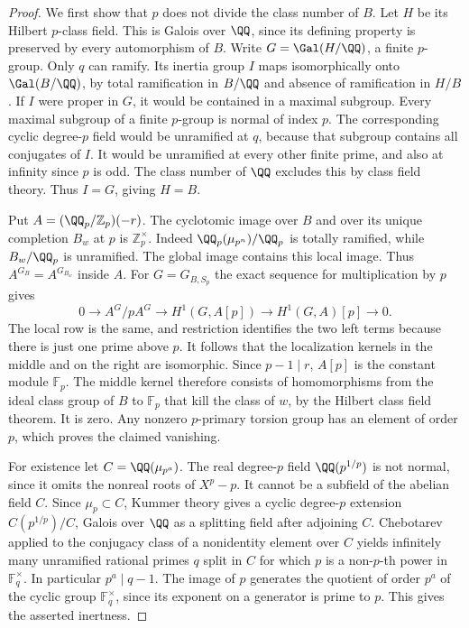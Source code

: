 \documentclass[a4paper,11pt]{article}
\theoremstyle{definition}
\theoremstyle{remark}
\newcommand{\ZZ}{\mathbb Z}\newcommand{\ord}{\operatorname{ord}}
\numberwithin{equation}{section}
\begin{document}
\begin{proof}
We first show that \(p\) does not divide the class number of \(B\).
Let \(H\) be its Hilbert \(p\)-class field. This is Galois over
\(\QQ\), since its defining property is preserved by every
automorphism of \(B\). Write \(G=\Gal(H/\QQ)\), a finite
\(p\)-group. Only \(q\) can ramify. Its inertia group \(I\)
maps isomorphically onto \(\Gal(B/\QQ)\), by total ramification
in \(B/\QQ\) and absence of ramification in \(H/B\).
If \(I\) were proper in \(G\), it would be contained in a
maximal subgroup. Every maximal subgroup of a finite \(p\)-group
is normal of index \(p\). The corresponding cyclic degree-\(p\)
field would be unramified at \(q\), because that subgroup contains
all conjugates of \(I\). It would be unramified at every other
finite prime, and also at infinity since \(p\) is odd. The
class number of \(\QQ\) excludes this by class field theory.
Thus \(I=G\), giving \(H=B\).

Put \(A=(\QQ_p/\ZZ_p)(-r)\). The cyclotomic image over \(B\)
and over its unique completion \(B_w\) at \(p\) is
\(\ZZ_p^\times\). Indeed \(\QQ_p(\mu_{p^n})/\QQ_p\) is totally
ramified, while \(B_w/\QQ_p\) is unramified. The global image
contains this local image. Thus \(A^{G_B}=A^{G_{B_w}}\)
inside \(A\). For \(G=G_{B,S_p}\) the exact sequence for
multiplication by \(p\) gives
\[
  0\longrightarrow A^G/pA^G\longrightarrow H^1(G,A[p])
      \longrightarrow H^1(G,A)[p]\longrightarrow0 .
\]
The local row is the same, and restriction identifies the two
left terms because there is just one prime above \(p\).
It follows that the localization kernels in the middle and
on the right are isomorphic. Since \(p-1\mid r\), \(A[p]\)
is the constant module \(\mathbb F_p\). The middle kernel
therefore consists of homomorphisms from the ideal class group
of \(B\) to \(\mathbb F_p\) that kill the class of \(w\), by
the Hilbert class field theorem. It is zero. Any nonzero
\(p\)-primary torsion group has an element of order \(p\),
which proves the claimed vanishing.

For existence let \(C=\QQ(\mu_{p^a})\).
The real degree-\(p\) field \(\QQ(p^{1/p})\) is not normal,
since it omits the nonreal roots of \(X^p-p\). It cannot be
a subfield of the abelian field \(C\).
Since \(\mu_p\subset C\), Kummer theory gives a cyclic
degree-\(p\) extension \(C(p^{1/p})/C\), Galois over \(\QQ\)
as a splitting field after adjoining \(C\).
Chebotarev applied to the conjugacy class of a nonidentity
element over \(C\) yields infinitely many unramified rational
primes \(q\) split in \(C\) for which \(p\) is a non-\(p\)-th
power in \(\mathbb F_q^\times\). In particular \(p^a\mid q-1\).
The image of \(p\) generates the quotient of order \(p^a\) of
the cyclic group \(\mathbb F_q^\times\), since its exponent
on a generator is prime to \(p\). This gives the asserted
inertness.


\end{proof}
\end{document}
